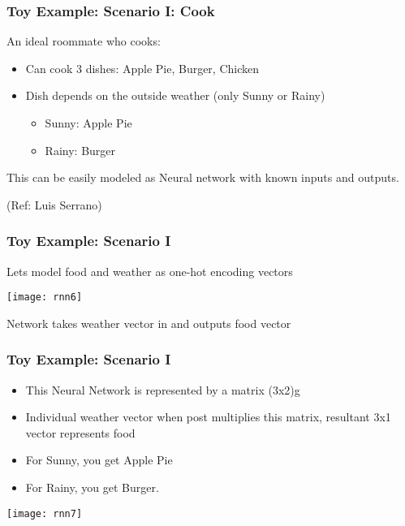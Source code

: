 \begin{frame}[fragile] \frametitle{Toy Example: Scenario I: Cook}
An ideal roommate who cooks:
\begin{itemize}
\item Can cook 3 dishes: Apple Pie, Burger, Chicken
\item Dish depends on the outside weather (only Sunny or Rainy)
\begin{itemize}
\item Sunny: Apple Pie
\item Rainy: Burger
\end{itemize}
\end{itemize}
This can be easily modeled as Neural network with known inputs and outputs.

{\tiny (Ref: Luis Serrano)}

\end{frame}

\begin{frame}[fragile] \frametitle{Toy Example: Scenario I}
Lets model food and weather as one-hot encoding vectors
\begin{center}
\texttt{[image: rnn6]}
\end{center}
Network takes weather vector in and outputs food vector
\end{frame}

\begin{frame}[fragile] \frametitle{Toy Example: Scenario I}
\begin{itemize}
\item This Neural Network is represented by a matrix (3x2)g
\item Individual weather vector when post multiplies this matrix, resultant 3x1 vector represents food
\item For Sunny, you get Apple Pie
\item For Rainy, you get Burger.
\end{itemize}
\begin{center}
\texttt{[image: rnn7]}
\end{center}
\end{frame}

